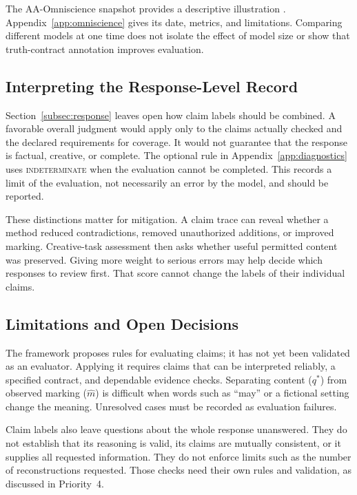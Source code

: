 \documentclass{clv2025}
\begin{document}
The AA-Omniscience snapshot provides a descriptive
illustration \citep{jackson_aaomniscience_2025,artificialanalysis_omniscience_leaderboard_2026}.
Appendix~\ref{app:omniscience} gives its date, metrics, and limitations.
Comparing different models at one time does not isolate the effect of model
size or show that truth-contract annotation improves evaluation.

\subsection{Interpreting the Response-Level Record}

Section~\ref{subsec:response} leaves open how claim labels should be combined.
A favorable overall judgment would apply only to the claims actually checked
and the declared requirements for coverage. It would not guarantee that the
response is factual, creative, or complete. The optional rule in
Appendix~\ref{app:diagnostics} uses \textsc{indeterminate} when the evaluation
cannot be completed. This records a limit of the evaluation, not necessarily
an error by the model, and should be reported.

These distinctions matter for mitigation. A claim trace can reveal whether a
method reduced contradictions, removed unauthorized additions, or improved
marking. Creative-task assessment then asks whether useful permitted content
was preserved. Giving more weight to serious errors may help decide which
responses to review first. That score cannot change the labels of their
individual claims.

\subsection{Limitations and Open Decisions}

The framework proposes rules for evaluating claims; it has not yet been
validated as an evaluator. Applying it requires claims that can be interpreted
reliably, a specified contract, and dependable evidence checks. Separating
content ($q^*$) from observed marking ($\widehat{m}$) is difficult when words
such as ``may'' or a fictional setting change the meaning. Unresolved cases
must be recorded as evaluation failures.

Claim labels also leave questions about the whole response unanswered. They
do not establish that its reasoning is valid, its claims are mutually
consistent, or it supplies all requested information. They do not enforce
limits such as the number of reconstructions requested. Those checks need
their own rules and validation, as discussed in Priority~4.
\end{document}
